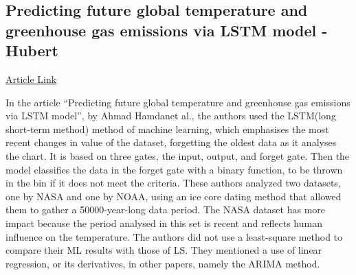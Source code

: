 \documentclass{article}
\begin{document}
\subsection{Predicting future global temperature and greenhouse gas emissions via LSTM model - Hubert}
\href{https://www.researchgate.net/publication/376555184_Predicting_future_global_temperature_and_greenhouse_gas_emissions_via_LSTM_model}{Article Link}
\par{
In the article “Predicting future global temperature and greenhouse gas emissions via LSTM model”, by Ahmad Hamdanet al., the authors used the LSTM(long short-term method) method of machine learning, which emphasises the most recent changes in value of the dataset, forgetting the oldest data as it analyses the chart. It is based on three gates, the input, output, and forget gate. Then the model classifies the data in the forget gate with a binary function, to be thrown in the bin if it does not meet the criteria. These authors analyzed two datasets, one by NASA and one by NOAA, using an ice core dating method that allowed them to gather a 50000-year-long data period. The NASA dataset has more impact because the period analysed in this set is recent and reflects human influence on the temperature. The authors did not use a least-square method to compare their ML results with those of LS. They mentioned a use of linear regression, or its derivatives, in other papers, namely the ARIMA method.
}
\end{document}
